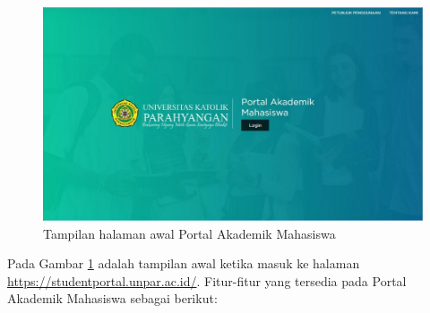 \begin{figure}[H]
	\centering
	\includegraphics[scale=0.4]{Gambar/halaman2018.jpg}
	\caption{Tampilan halaman awal Portal Akademik Mahasiswa} 
	\label{fig:studpor_home_2018}
\end{figure}
\newpage
Pada Gambar \ref{fig:studpor_home_2018} adalah tampilan awal ketika masuk ke halaman \url{https://studentportal.unpar.ac.id/}. Fitur-fitur yang tersedia pada Portal Akademik Mahasiswa sebagai berikut:
